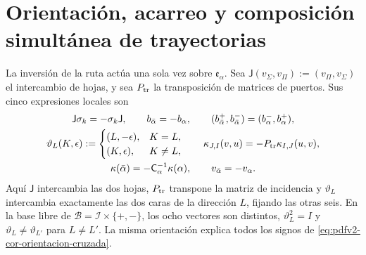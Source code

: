 \section{Orientación, acarreo y composición simultánea de trayectorias}

La inversión de la ruta actúa una sola vez sobre
\(\mathfrak e_\alpha\). Sea
\(\mathsf J(v_\Sigma,v_\Pi):=(v_\Pi,v_\Sigma)\) el intercambio de hojas,
y sea \(P_{\rm tr}\) la transposición de matrices de puertos. Sus cinco
expresiones locales son
\begin{equation}
\label{eq:pdfv2-cor-orientacion-cruzada}
 \begin{gathered}
 \mathsf J\sigma_k=-\sigma_k\mathsf J,
 \qquad b_{\bar\alpha}=-b_\alpha,
 \qquad (b_{\bar\alpha}^+,b_{\bar\alpha}^-)
       =(b_\alpha^-,b_\alpha^+),\\
 \vartheta_L(K,\epsilon):=
 \begin{cases}
  (L,-\epsilon),&K=L,\\
  (K,\epsilon),&K\neq L,
 \end{cases}
 \qquad
 \kappa_{J,I}(v,u)=-P_{\rm tr}\kappa_{I,J}(u,v),\\
 \kappa(\bar\alpha)
 =-\mathsf C_\alpha^{-1}\kappa(\alpha),
 \qquad v_{\bar\alpha}=-v_\alpha.
 \end{gathered}
\end{equation}
Aquí \(\mathsf J\) intercambia las dos hojas, \(P_{\rm tr}\) transpone la matriz de
incidencia y \(\vartheta_L\) intercambia exactamente las dos caras de la
dirección \(L\), fijando las otras seis. En la base libre de
\(\mathscr B=\mathscr I\times\{+,-\}\), los ocho vectores son distintos,
\(\vartheta_L^2=I\) y
\(\vartheta_L\neq\vartheta_{L'}\) para \(L\neq L'\). La misma orientación
explica todos los signos de
\eqref{eq:pdfv2-cor-orientacion-cruzada}.

